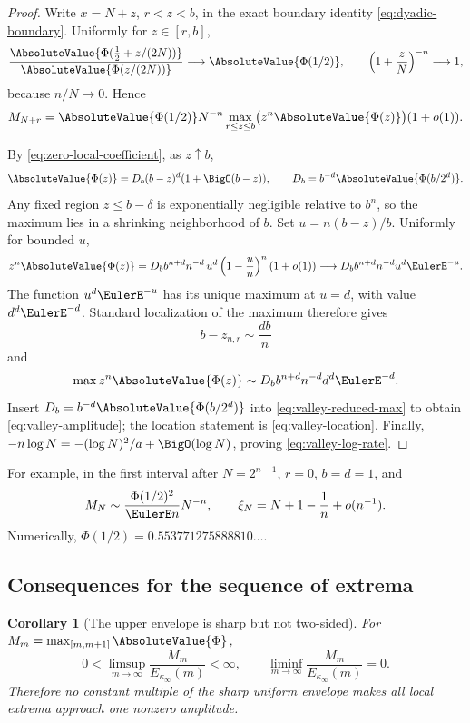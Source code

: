 \documentclass[11pt,oneside]{article}
\newtheorem{corollary}[theorem]{Corollary}
\theoremstyle{definition}
\theoremstyle{remark}
\newcommand{\Phiup}{\Phi}
\begin{document}
\begin{proof}
Write $x=N+z$, $r<z<b$, in the exact boundary identity
\eqref{eq:dyadic-boundary}.  Uniformly for $z\in[r,b]$,
\begin{equation}
 \frac{\AbsoluteValue{\Phiup(\tfrac12+z/(2N))}}
      {\AbsoluteValue{\Phiup(z/(2N))}}
 \longrightarrow\AbsoluteValue{\Phiup(1/2)},
 \qquad
 \left(1+\frac zN\right)^{-n}\longrightarrow1,
 \label{eq:valley-uniform-factors}
\end{equation}
because $n/N\to0$.  Hence
\begin{equation}
 M_{N+r}
 =\AbsoluteValue{\Phiup(1/2)}N^{-n}
   \max_{r\le z\le b}\bigl(z^n\AbsoluteValue{\Phiup(z)}\bigr)(1+o(1)).
 \label{eq:valley-reduced-max}
\end{equation}

By \eqref{eq:zero-local-coefficient}, as $z\uparrow b$,
\[
 \AbsoluteValue{\Phiup(z)}
 =D_b(b-z)^d(1+\BigO(b-z)),
 \qquad
 D_b=b^{-d}\AbsoluteValue{\Phiup(b/2^d)}.
\]
Any fixed region $z\le b-\delta$ is exponentially negligible relative to $b^n$, so the
maximum lies in a shrinking neighborhood of $b$.  Set
$u=n(b-z)/b$.  Uniformly for bounded $u$,
\[
 z^n\AbsoluteValue{\Phiup(z)}
 =D_b b^{n+d}n^{-d}\,u^d\left(1-\frac un\right)^n(1+o(1))
 \longrightarrow
 D_b b^{n+d}n^{-d}u^d\EulerE^{-u}.
\]
The function $u^d\EulerE^{-u}$ has its unique maximum at $u=d$, with value $d^d\EulerE^{-d}$.
Standard localization of the maximum therefore gives
\[
 b-z_{n,r}\sim\frac{db}{n}
\]
and
\[
 \max z^n\AbsoluteValue{\Phiup(z)}
 \sim D_b b^{n+d}n^{-d}d^d\EulerE^{-d}.
\]
Insert $D_b=b^{-d}\AbsoluteValue{\Phiup(b/2^d)}$ into
\eqref{eq:valley-reduced-max} to obtain \eqref{eq:valley-amplitude}; the location statement
is \eqref{eq:valley-location}.  Finally,
$-n\log N=-(\log N)^2/a+\BigO(\log N)$, proving
\eqref{eq:valley-log-rate}.
\end{proof}

For example, in the first interval after $N=2^{n-1}$, $r=0$, $b=d=1$, and
\begin{equation}
 M_N\sim\frac{\Phiup(1/2)^2}{\EulerE n}N^{-n},
 \qquad
 \xi_N=N+1-\frac1n+o(n^{-1}).
 \label{eq:first-dyadic-valley}
\end{equation}
Numerically,
$\Phiup(1/2)=0.553771275888810\ldots$.

\subsection{Consequences for the sequence of extrema}

\begin{corollary}[The upper envelope is sharp but not two-sided]
\label{cor:extrema-limsup-liminf}
For $M_m=\max_{[m,m+1]}\AbsoluteValue{\Phiup}$,
\begin{equation}
 0<\limsup_{m\to\infty}\frac{M_m}{E_{\kappa_\infty}(m)}<\infty,
 \qquad
 \liminf_{m\to\infty}\frac{M_m}{E_{\kappa_\infty}(m)}=0.
 \label{eq:extrema-limsup-liminf}
\end{equation}
Therefore no constant multiple of the sharp uniform envelope makes all local extrema
approach one nonzero amplitude.
\end{corollary}
\end{document}
